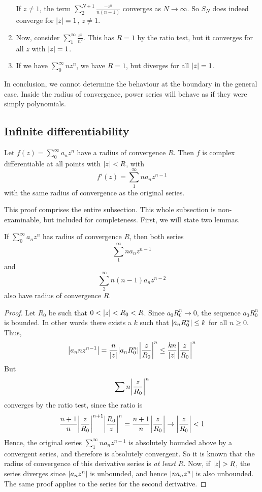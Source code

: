 \begin{example}
\begin{enumerate}
	      If \(z \neq 1\), the term \(\sum_2^{N+1} \frac{-z^n}{n(n-1)}\) converges as \(N \to \infty\).
	      So \(S_N\) does indeed converge for \(\abs{z} = 1\), \(z \neq 1\).
	\item Now, consider \(\sum_1^\infty \frac{z^n}{n^2}\).
	      This has \(R=1\) by the ratio test, but it converges for all \(z\) with \(\abs{z} = 1\).
	\item If we have \(\sum_0^\infty nz^n\), we have \(R=1\), but diverges for all \(\abs{z} = 1\).
\end{enumerate}
In conclusion, we cannot determine the behaviour at the boundary in the general case.
Inside the radius of convergence, power series will behave as if they were simply polynomials.
\end{example}

\subsection{Infinite differentiability}
\begin{theorem}
	Let \(f(z) = \sum_0^\infty a_n z^n\) have a radius of convergence \(R\).
	Then \(f\) is complex differentiable at all points with \(\abs{z} < R\), with
	\[
		f'(z) = \sum_1^\infty n a_n z^{n-1}
	\]
	with the same radius of convergence as the original series.
\end{theorem}
This proof comprises the entire subsection.
This whole subsection is non-examinable, but included for completeness.
First, we will state two lemmas.
\begin{lemma}
	If \(\sum_0^\infty a_n z^n\) has radius of convergence \(R\), then both series
	\[
		\sum_1^\infty n a_n z^{n-1}
	\]
	and
	\[
		\sum_2^\infty n(n-1)a_n z^{n-2}
	\]
	also have radius of convergence \(R\).
\end{lemma}
\begin{proof}
	Let \(R_0\) be such that \(0 < \abs{z} < R_0 < R\).
	Since \(a_0 R_0^n \to 0\), the sequence \(a_0 R_0^n\) is bounded.
	In other words there exists a \(k\) such that \(\abs{a_n R_0^n} \leq k\) for all \(n \geq 0\).
	Thus,
	\[
		\abs{a_n n z^{n-1}} = \frac{n}{\abs{z}}\abs{a_n R_0^n} \abs{\frac{z}{R_0}}^n \leq \frac{kn}{\abs{z}}\abs{\frac{z}{R_0}}^n
	\]
	But
	\[
		\sum n\abs{\frac{z}{R_0}}^n
	\]
	converges by the ratio test, since the ratio is
	\[
		\frac{n+1}{n}\abs{\frac{z}{R_0}}^{n+1} \abs{\frac{R_0}{z}}^n = \frac{n+1}{n}\abs{\frac{z}{R_0}} \to \abs{\frac{z}{R_0}} < 1
	\]
	Hence, the original series \(\sum_1^\infty n a_n z^{n-1}\) is absolutely bounded above by a convergent series, and therefore is absolutely convergent.
	So it is known that the radius of convergence of this derivative series is \textit{at least} \(R\).
	Now, if \(\abs{z} > R\), the series diverges since \(\abs{a_n z^n}\) is unbounded, and hence \(\abs{n a_n z^n}\) is also unbounded.
	The same proof applies to the series for the second derivative.
\end{proof}
